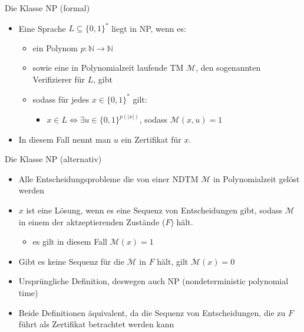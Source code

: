 \documentclass[ignorenonframetext,]{beamer}
\begin{document}
\begin{frame}{Die Klasse NP (formal)}

\begin{itemize}
\itemsep1pt\parskip0pt
\item
  Eine Sprache $L \subseteq \{0, 1\}^*$ liegt in NP, wenn es:

  \begin{itemize}
  \itemsep1pt\parskip0pt
  \item
    ein Polynom $p: \mathbb{N} \rightarrow \mathbb{N}$
  \item
    sowie eine in Polynomialzeit laufende TM $\mathcal{M}$, den
    sogenannten Verifizierer für $L$, gibt
  \item
    sodass für jedes $x \in \{0, 1\}^*$ gilt:

    \begin{itemize}
    \itemsep1pt\parskip0pt
    \item
      $x \in L \Leftrightarrow \exists u \in \{0, 1\}^{p(|x|)}$, sodass
      $\mathcal{M}(x, u) = 1$
    \end{itemize}
  \end{itemize}
\item
  In diesem Fall nennt man $u$ ein Zertifikat für $x$.
\end{itemize}

\end{frame}

\begin{frame}{Die Klasse NP (alternativ)}

\begin{itemize}
\itemsep1pt\parskip0pt
\item
  Alle Entscheidungsprobleme die von einer NDTM $\mathcal{M}$ in
  Polynomialzeit gelöst werden
\item
  $x$ ist eine Lösung, wenn es eine Sequenz von Entscheidungen gibt,
  sodass $\mathcal{M}$ in einem der aktzeptierenden Zustände ($F$) hält.

  \begin{itemize}
  \itemsep1pt\parskip0pt
  \item
    es gilt in diesem Fall $\mathcal{M}(x) = 1$
  \end{itemize}
\item
  Gibt es keine Sequenz für die $\mathcal{M}$ in $F$ hält, gilt
  $\mathcal{M}(x) = 0$
\item
  Ursprüngliche Definition, deswegen auch NP (nondeterministic
  polynomial time)
\item
  Beide Definitionen äquivalent, da die Sequenz von Entscheidungen, die
  zu $F$ führt als Zertifikat betrachtet werden kann
\end{itemize}

\end{frame}
\end{document}
